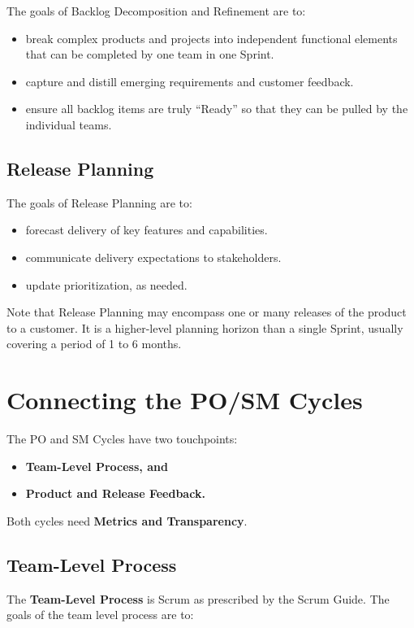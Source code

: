 \documentclass[12pt,a4paper,parskip=full]{scrartcl}
\begin{document}
The goals of Backlog Decomposition and Refinement are to:

\begin{itemize}
	\item break complex products and projects into independent functional elements that can be completed by one team in one Sprint.
	\item capture and distill emerging requirements and customer feedback.
	\item ensure all backlog items are truly ``Ready'' so that they can be pulled by the individual teams.
\end{itemize}

\subsection{Release Planning}

The goals of Release Planning are to:

\begin{itemize}
	\item forecast delivery of key features and capabilities.
	\item communicate delivery expectations to stakeholders.
	\item update prioritization, as needed.
\end{itemize}

Note that Release Planning may encompass one or many releases of the product to a customer. It is a higher-level planning horizon than a single Sprint, usually covering a period of 1 to 6 months.

\section{Connecting the PO/SM Cycles}

The PO and SM Cycles have two touchpoints:
\begin{itemize}
	\item \textbf{Team-Level Process, and}
	\item \textbf{Product and Release Feedback.}
\end{itemize}
Both cycles need \textbf{Metrics and Transparency}.

\subsection{Team-Level Process}

The \textbf{Team-Level Process} is Scrum as prescribed by the Scrum Guide. The goals of the team level process are to:
\end{document}

